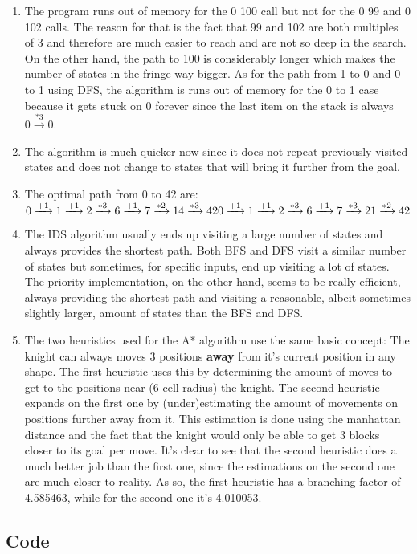 \documentclass[a4paper]{article}
\begin{document}
\begin{enumerate}
\item The program runs out of memory for the 0 100 call but not for the 0 99 and 0 102 calls. The reason for that is the fact that 99 and 102 are both multiples of 3 and therefore are much easier to reach and are not so deep in the search. On the other hand, the path to 100 is considerably longer which makes the number of states in the fringe way bigger. As for the path from 1 to 0 and 0 to 1 using DFS, the algorithm is runs out of memory for the 0 to 1 case because it gets stuck on 0 forever since the last item on the stack is always $0 \xrightarrow{*3} 0$.

\item The algorithm is much quicker now since it does not repeat previously visited states and does not change to states that will bring it further from the goal.

\addtocounter{enumi}{2}
\item The optimal path from 0 to 42 are: \\
$
0 \xrightarrow{+1} 1 \xrightarrow{+1} 2 \xrightarrow{*3} 6 \xrightarrow{+1} 7 \xrightarrow{*2} 14 \xrightarrow{*3} 42 \\
0 \xrightarrow{+1} 1 \xrightarrow{+1} 2 \xrightarrow{*3} 6 \xrightarrow{+1} 7 \xrightarrow{*3} 21 \xrightarrow{*2} 42 
$

\addtocounter{enumi}{1}
\item The IDS algorithm usually ends up visiting a large number of states and always provides the shortest path. Both BFS and DFS visit a similar number of states but sometimes, for specific inputs, end up visiting a lot of states. The priority implementation, on the other hand, seems to be really efficient, always providing the shortest path and visiting a reasonable, albeit sometimes slightly larger, amount of states than the BFS and DFS.

\item The two heuristics used for the A* algorithm use the same basic concept: The knight can always moves 3 positions \textbf{away} from it's current position in any shape. The first heuristic uses this by determining the amount of moves to get to the positions near (6 cell radius) the knight. The second heuristic expands on the first one by (under)estimating the amount of movements on positions further away from it. This estimation is done using the manhattan distance and the fact that the knight would only be able to get 3 blocks closer to its goal per move. It's clear to see that the second heuristic does a much better job than the first one, since the estimations on the second one are much closer to reality. As so, the first heuristic has a branching factor of 4.585463, while for the second one it's 4.010053.

\end{enumerate}

\subsection{Code}







\end{document}
